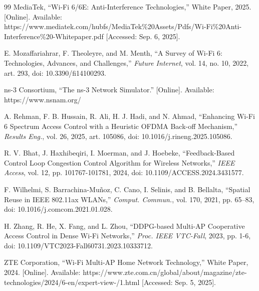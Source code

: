 \documentclass[conference]{IEEEtran}
\begin{document}
\begin{thebibliography}{99}
 MediaTek, ``Wi-Fi 6/6E: Anti-Interference Technologies,'' White Paper, 2025. [Online]. Available: https://www.mediatek.com/hubfs/MediaTek\%20Assets/Pdfs/Wi-Fi\%20Anti-Interference\%20-Whitepaper.pdf [Accessed: Sep. 6, 2025].

 E. Mozaffariahrar, F. Theoleyre, and M. Menth, ``A Survey of Wi-Fi 6: Technologies, Advances, and Challenges,'' \textit{Future Internet}, vol. 14, no. 10, 2022, art. 293, doi: 10.3390/fi14100293.

 ns-3 Consortium, ``The ns-3 Network Simulator.'' [Online]. Available: https://www.nsnam.org/

 A. Rehman, F. B. Hussain, R. Ali, H. J. Hadi, and N. Ahmad, ``Enhancing Wi-Fi 6 Spectrum Access Control with a Heuristic OFDMA Back-off Mechanism,'' \textit{Results Eng.}, vol. 26, 2025, art. 105086, doi: 10.1016/j.rineng.2025.105086.

 R. V. Bhat, J. Haxhibeqiri, I. Moerman, and J. Hoebeke, ``Feedback-Based Control Loop Congestion Control Algorithm for Wireless Networks,'' \textit{IEEE Access}, vol. 12, pp. 101767-101781, 2024, doi: 10.1109/ACCESS.2024.3431577.

 F. Wilhelmi, S. Barrachina-Muñoz, C. Cano, I. Selinis, and B. Bellalta, ``Spatial Reuse in IEEE 802.11ax WLANs,'' \textit{Comput. Commun.}, vol. 170, 2021, pp. 65–83, doi: 10.1016/j.comcom.2021.01.028.

 H. Zhang, R. He, X. Fang, and L. Zhou, ``DDPG-based Multi-AP Cooperative Access Control in Dense Wi-Fi Networks,'' \textit{Proc. IEEE VTC-Fall}, 2023, pp. 1-6, doi: 10.1109/VTC2023-Fall60731.2023.10333712.

 ZTE Corporation, ``Wi-Fi Multi-AP Home Network Technology,'' White Paper, 2024. [Online]. Available: https://www.zte.com.cn/global/about/magazine/zte-technologies/2024/6-en/expert-view-/1.html [Accessed: Sep. 5, 2025].


\end{thebibliography}
\end{document}
